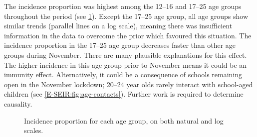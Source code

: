 \documentclass[thesis.tex]{subfiles}
\begin{document}
The incidence proportion was highest among the 12--16 and 17--25 age groups throughout the period (see \cref{transmission:fig:backcalc-ages}).
Except the 17--25 age group, all age groups show similar trends (\ie parallel lines on a log scale), meaning there was insufficient information in the data to overcome the prior which favoured this situation.
The incidence proportion in the 17--25 age group decreases faster than other age groups during November.
There are many plausible explanations for this effect.
The higher incidence in this age group prior to November means it could be an immunity effect.
Alternatively, it could be a consequence of schools remaining open in the November lockdown; 20--24 year olds rarely interact with school-aged children (see \cref{E-SEIR:fig:age-contacts}).
Further work is required to determine causality.
\begin{figure}
    \caption[Incidence estimated using the phenomenological approach by age group]{%
        Incidence proportion for each age group, on both natural and log scales.
    }
    \label{transmission:fig:backcalc-ages}
\end{figure}
\end{document}
